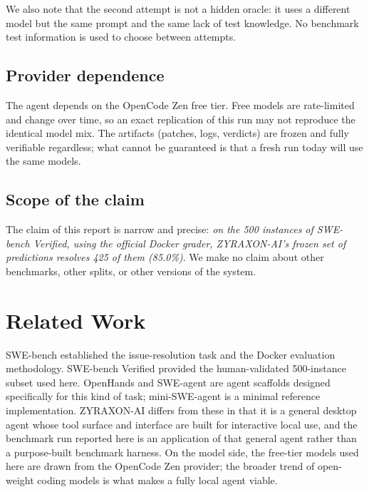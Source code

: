 \documentclass[11pt,a4paper]{article}
\begin{document}
We also note that the second attempt is not a hidden oracle: it uses a different model
but the same prompt and the same lack of test knowledge. No benchmark test information is
used to choose between attempts.

\subsection{Provider dependence}

The agent depends on the OpenCode Zen free tier. Free models are rate-limited and change
over time, so an exact replication of this run may not reproduce the identical model mix.
The artifacts (patches, logs, verdicts) are frozen and fully verifiable regardless; what
cannot be guaranteed is that a fresh run today will use the same models.

\subsection{Scope of the claim}

The claim of this report is narrow and precise: \emph{on the 500 instances of SWE-bench
Verified, using the official Docker grader, ZYRAXON-AI's frozen set of predictions
resolves 425 of them (85.0\%)}. We make no claim about other benchmarks, other splits, or
other versions of the system.

\section{Related Work}

SWE-bench \cite{jimenez2024swebench} established the issue-resolution task and the Docker
evaluation methodology. SWE-bench Verified \cite{openai2024verified} provided the
human-validated 500-instance subset used here. OpenHands \cite{wang2024openhands} and
SWE-agent \cite{yang2024sweagent} are agent scaffolds designed specifically for this kind
of task; mini-SWE-agent is a minimal reference implementation. ZYRAXON-AI differs from
these in that it is a general desktop agent whose tool surface and interface are built
for interactive local use, and the benchmark run reported here is an application of that
general agent rather than a purpose-built benchmark harness. On the model side, the
free-tier models used here are drawn from the OpenCode Zen provider; the broader trend of
open-weight coding models is what makes a fully local agent viable.
\end{document}
